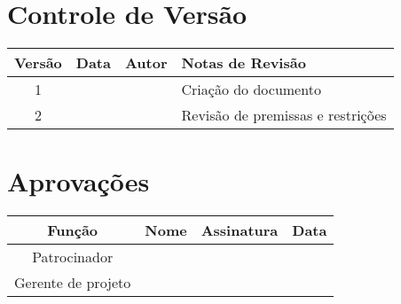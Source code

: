 
\section{Controle de Versão}

\begin{table}[H]
	\begin{tabularx}{\textwidth}{| c | c | X | X |}
		\hline
		\textbf{Versão} & \textbf{Data} & \textbf{Autor}        & \textbf{Notas de Revisão}           \\
		\hline
		1                &               & \projectManagerName{} & Criação do documento               \\
		2                &               & \projectManagerName{} & Revisão de premissas e restrições \\
		\hline
	\end{tabularx}
	\centering
\end{table}

\section{Aprovações}

\begin{table}[H]
	\begin{tabularx}{\textwidth}{| c | c | X | c |}
		\hline
		\textbf{Função}  & \textbf{Nome}         & \textbf{Assinatura}        & \textbf{Data} \\
		\hline
		Patrocinador       & \projectSponsorName{} & \projectSponsorSignature{} &               \\
		\hline
		Gerente de projeto & \projectManagerName{} & \projectManagerSignature{} &               \\
		\hline
	\end{tabularx}
	\centering
\end{table}